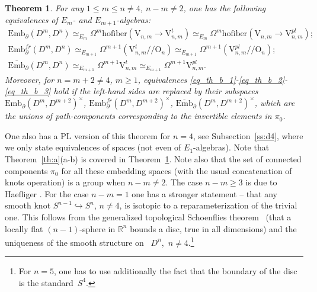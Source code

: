 \documentclass[11pt]{amsart}
\newtheorem{mainthm}{Theorem}
\theoremstyle{definition}
\newcommand{\R}{{\mathbb R}}
\newcommand{\Ebarmn}{{\overline{\mathrm{Emb}}}_\partial(D^m,D^n)}
\newcommand{\Embmn}{\mathrm{Emb}_\partial(D^m,D^n)}
\newcommand{\Embfrmn}{\mathrm{Emb}_\partial^{fr}(D^m,D^n)}
\newcommand{\Ebar}{\overline{\mathrm{Emb}}}
\newcommand{\Emb}{\mathrm{Emb}}
\newcommand{\OO}{\mathrm{O}}
\newcommand{\VV}{\mathrm{V}}
\newcommand{\hofiber}{\mathrm{hofiber}}
\numberwithin{equation}{section}
\begin{document}
\begin{mainthm}\label{th:b}
For any $1\leq m\leq n\neq 4$, $n-m\neq 2$, one has the following equivalences of $E_m$- and $E_{m+1}$-algebras:
\begin{gather}
\Embmn\simeq_{E_{m}} \Omega^m\hofiber (\VV_{n,m} \to \VV^t_{n,m}) \simeq_{E_{m}} \Omega^m \hofiber(\VV_{n,m} \to \VV^{pl}_{n,m});\label{eq_th_b_1}\\
\Embfrmn\simeq_{E_{m+1}} \Omega^{m+1}(  \VV^{t}_{n,m}/\!\!/ \OO_n  )\simeq_{E_{m+1}}\Omega^{m+1}( \VV^{pl}_{n,m} /\!\!/\OO_n);\label{eq_th_b_2}\\
\Ebarmn\simeq_{E_{m+1}} \Omega^{m+1} \VV^t_{n,m}\simeq_{E_{m+1}} \Omega^{m+1}\VV^{pl}_{n,m}.\label{eq_th_b_3}
\end{gather}
Moreover, for $n=m+2\neq 4$, $m\geq 1$, equivalences \eqref{eq_th_b_1}-\eqref{eq_th_b_2}-\eqref{eq_th_b_3} hold if the left-hand sides are replaced by their subspaces  %
$\Emb_\partial(D^m,D^{m+2})^{\times}$, $\Emb_\partial^{fr}(D^m,D^{m+2})^{\times}$, $\Ebar_\partial(D^m,D^{m+2})^{\times}$, which are the unions of path-components corresponding to the invertible elements in $\pi_0$.
\end{mainthm}

One also has a PL version of this theorem for $n=4$, see Subsection~\ref{ss:d4}, where we only state equivalences of spaces (not even of $E_1$-algebras). Note that 
Theorem~\ref{th:a}(a-b) is covered in  Theorem~\ref{th:b}. 
Note also that the set of connected components $\pi_0$ for all these embedding spaces (with the usual concatenation of knots operation) is a group when $n-m\neq 2$. The case $n-m\geq 3$ is due to Haefliger
\cite{Haefliger}. For the case $n-m=1$ one has a stronger statement -- that any smooth knot $S^{n-1}\hookrightarrow S^n$,  $n\neq 4$, is isotopic to a reparameterization of the trivial one. This follows from the generalized topological Schoenflies theorem~\cite{Brown,Mazur,Morse} (that a locally flat $(n-1)$-sphere in $\R^n$ bounds a disc, true in all dimensions) and the uniqueness of the smooth structure on ~$D^n$,~$n\neq 4$.\footnote{For $n=5$, one has to use additionally the fact that the boundary of the disc is the standard~$S^4$.} 
\end{document}

